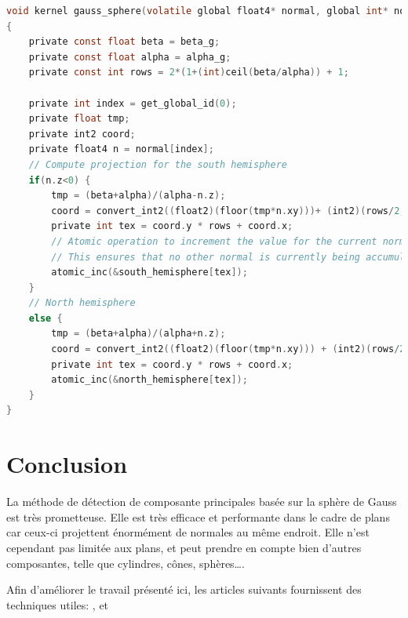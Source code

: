 \documentclass{article}
\begin{document}
\begin{lstlisting}[language=c,breaklines=true]
void kernel gauss_sphere(volatile global float4* normal, global int* north_hemisphere, global int* south_hemisphere, const float alpha_g, const float beta_g)
{
    private const float beta = beta_g;
    private const float alpha = alpha_g; 
    private const int rows = 2*(1+(int)ceil(beta/alpha)) + 1;
    
    private int index = get_global_id(0);
    private float tmp;
    private int2 coord;
    private float4 n = normal[index];
    // Compute projection for the south hemisphere
    if(n.z<0) {
        tmp = (beta+alpha)/(alpha-n.z);
        coord = convert_int2((float2)(floor(tmp*n.xy)))+ (int2)(rows/2, rows/2);
        private int tex = coord.y * rows + coord.x;
        // Atomic operation to increment the value for the current normal.
        // This ensures that no other normal is currently being accumulated at this position.
        atomic_inc(&south_hemisphere[tex]);
    } 
    // North hemisphere
    else {
        tmp = (beta+alpha)/(alpha+n.z);
        coord = convert_int2((float2)(floor(tmp*n.xy))) + (int2)(rows/2, rows/2);
        private int tex = coord.y * rows + coord.x;
        atomic_inc(&north_hemisphere[tex]);
    }
}
\end{lstlisting}


\section{Conclusion}
La méthode de détection de composante principales basée sur la sphère de Gauss est très prometteuse. Elle est très efficace et performante dans le cadre de plans car ceux-ci projettent énormément de normales au même endroit. Elle n'est cependant pas limitée aux plans, et peut prendre en compte bien d'autres composantes, telle que cylindres, cônes, sphères\ldots.

Afin d'améliorer le travail présenté ici, les articles suivants fournissent des techniques utiles: \citep{Gauss}, \citep{3DReconstructionlod} et \citep{li_globFit_sigg11}



\pagebreak


\end{document}
